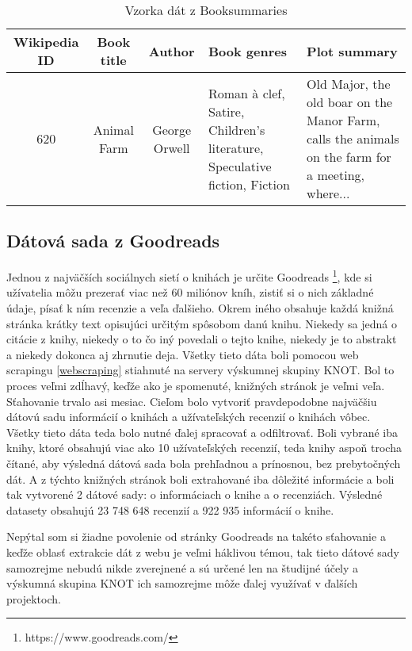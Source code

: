 \begin{table}[hbt]
\centering
\caption{Vzorka dát z Booksummaries}
\label{booksummaries}
\begin{tabular}{|c|c|c|
>{\centering\arraybackslash}m{7em}|
>{\centering\arraybackslash}m{7em}|}
\hline
Wikipedia ID & Book title & Author & Book genres & Plot summary \\
\hline
620 & Animal Farm & George Orwell & Roman à clef, Satire, Children's literature, Speculative fiction, Fiction &  Old Major, the old boar on the Manor Farm, calls the animals on the farm for a meeting, where...\\ 
\hline

\end{tabular}
\end{table}

\subsection{Dátová sada z Goodreads}

Jednou z najväčších sociálnych sietí o knihách je určite Goodreads \footnote{https://www.goodreads.com/}, kde si užívatelia môžu prezerať viac než 60 miliónov kníh, zistiť si o nich základné údaje, písať k ním recenzie a veľa ďalšieho. Okrem iného obsahuje každá knižná stránka krátky text opisujúci určitým spôsobom danú knihu. Niekedy sa jedná o citácie z knihy, niekedy o to čo iný povedali o tejto knihe, niekedy je to abstrakt a niekedy dokonca aj zhrnutie deja. Všetky tieto dáta boli pomocou web scrapingu \ref{webscraping} stiahnuté na servery výskumnej skupiny KNOT. Bol to proces veľmi zdĺhavý, keďže ako je spomenuté, knižných stránok je veľmi veľa. Sťahovanie trvalo asi mesiac. Cieľom bolo vytvoriť pravdepodobne najväčšiu dátovú sadu informácií o knihách a užívateľských recenzií o knihách vôbec. Všetky tieto dáta teda bolo nutné ďalej spracovať a odfiltrovať. Boli vybrané iba knihy, ktoré obsahujú viac ako 10 užívateľských recenzií, teda knihy aspoň trocha čítané, aby výsledná dátová sada bola prehľadnou a prínosnou, bez prebytočných dát. A z týchto knižných stránok boli extrahované iba dôležité informácie a boli tak vytvorené 2 dátové sady: o informáciach o knihe a o recenziách. Výsledné datasety obsahujú 23 748 648 recenzií a 922 935 informácií o knihe. 

Nepýtal som si žiadne povolenie od stránky Goodreads na takéto sťahovanie a keďže oblasť extrakcie dát z webu je veľmi háklivou témou, tak tieto dátové sady samozrejme nebudú nikde zverejnené a sú určené len na študijné účely a výskumná skupina KNOT ich samozrejme môže ďalej využívať v ďalších projektoch.

